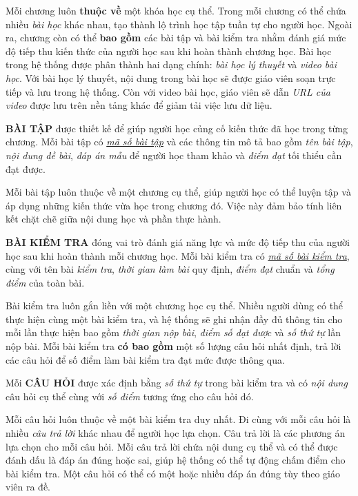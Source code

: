 Mỗi chương luôn \textbf{thuộc về} một khóa học cụ thể. Trong mỗi chương có thể chứa nhiều \textit{bài học} khác nhau, tạo thành lộ trình học tập tuần tự cho người học. Ngoài ra, chương còn có thể \textbf{bao gồm} các bài tập và bài kiểm tra nhằm đánh giá mức độ tiếp thu kiến thức của người học sau khi hoàn thành chương học. Bài học trong hệ thống được phân thành hai dạng chính: \textit{bài học lý thuyết} và \textit{video bài học}. Với bài học lý thuyết, nội dung trong bài học sẽ được giáo viên soạn trực tiếp và lưu trong hệ thống. Còn với video bài học, giáo viên sẽ dẫn \textit{URL của video} được lưu trên nền tảng khác để giảm tải việc lưu dữ liệu.

\textbf{BÀI TẬP} được thiết kế để giúp người học củng cố kiến thức đã học trong từng chương. Mỗi bài tập có \underline{\textit{mã số bài tập}} và các thông tin mô tả bao gồm \textit{tên bài tập}, \textit{nội dung đề bài}, \textit{đáp án mẫu} để người học tham khảo và \textit{điểm đạt} tối thiểu cần đạt được.

Mỗi bài tập luôn thuộc về một chương cụ thể, giúp người học có thể luyện tập và áp dụng những kiến thức vừa học trong chương đó. Việc này đảm bảo tính liên kết chặt chẽ giữa nội dung học và phần thực hành.

\textbf{BÀI KIỂM TRA} đóng vai trò đánh giá năng lực và mức độ tiếp thu của người học sau khi hoàn thành mỗi chương học. Mỗi bài kiểm tra có \underline{\textit{mã số bài kiểm tra}}, cùng với tên bài \textit{kiểm tra}, \textit{thời gian làm bài} quy định, \textit{điểm đạt} chuẩn và \textit{tổng điểm} của toàn bài.

Bài kiểm tra luôn gắn liền với một chương học cụ thể. Nhiều người dùng có thể thực hiện cùng một bài kiểm tra, và hệ thống sẽ ghi nhận đầy đủ thông tin cho mỗi lần thực hiện bao gồm \textit{thời gian nộp bài}, \textit{điểm số đạt được} và \textit{số thứ tự} lần nộp bài. Mỗi bài kiểm tra \textbf{có bao gồm} một số lượng câu hỏi nhất định, trả lời các câu hỏi để số điểm làm bài kiểm tra đạt mức được thông qua.

Mỗi \textbf{CÂU HỎI} được xác định bằng \textit{số thứ tự }trong bài kiểm tra và có \textit{nội dung} câu hỏi cụ thể cùng với \textit{số điểm} tương ứng cho câu hỏi đó.

Mỗi câu hỏi luôn thuộc về một bài kiểm tra duy nhất. Đi cùng với mỗi câu hỏi là nhiều \textit{câu trả lời} khác nhau để người học lựa chọn. Câu trả lời là các phương án lựa chọn cho mỗi câu hỏi. Mỗi câu trả lời chứa nội dung cụ thể và có thể được đánh dấu là đáp án đúng hoặc sai, giúp hệ thống có thể tự động chấm điểm cho bài kiểm tra. Một câu hỏi có thể có một hoặc nhiều đáp án đúng tùy theo giáo viên ra đề.

